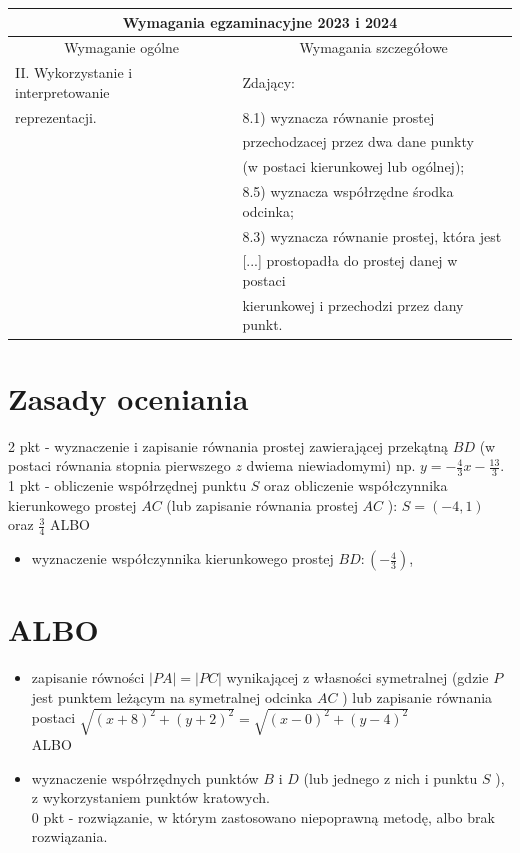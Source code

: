 \documentclass[10pt]{article}
\begin{document}
\begin{center}
\begin{tabular}{|l|l|}
\hline
\multicolumn{2}{|c|}{Wymagania egzaminacyjne 2023 i 2024} \\
\hline
\multicolumn{1}{|c|}{Wymaganie ogólne} & \multicolumn{1}{c|}{Wymagania szczegółowe} \\
\hline
II. Wykorzystanie i interpretowanie & Zdający: \\
reprezentacji. & 8.1) wyznacza równanie prostej \\
 & przechodzacej przez dwa dane punkty \\
 & (w postaci kierunkowej lub ogólnej); \\
 & 8.5) wyznacza współrzędne środka odcinka; \\
 & 8.3) wyznacza równanie prostej, która jest \\
 & [...] prostopadła do prostej danej w postaci \\
 & kierunkowej i przechodzi przez dany punkt. \\
\hline
\end{tabular}
\end{center}

\section*{Zasady oceniania}
2 pkt - wyznaczenie i zapisanie równania prostej zawierającej przekątną $B D$ (w postaci równania stopnia pierwszego $z$ dwiema niewiadomymi) np. $y=-\frac{4}{3} x-\frac{13}{3}$.\\
1 pkt - obliczenie współrzędnej punktu $S$ oraz obliczenie współczynnika kierunkowego prostej $A C$ (lub zapisanie równania prostej $A C$ ): $S=(-4,1)$ oraz $\frac{3}{4}$ ALBO

\begin{itemize}
  \item wyznaczenie współczynnika kierunkowego prostej $B D:\left(-\frac{4}{3}\right)$,
\end{itemize}

\section*{ALBO}
\begin{itemize}
  \item zapisanie równości $|P A|=|P C|$ wynikającej z własności symetralnej (gdzie $P$ jest punktem leżącym na symetralnej odcinka $A C$ ) lub zapisanie równania postaci $\sqrt{(x+8)^{2}+(y+2)^{2}}=\sqrt{(x-0)^{2}+(y-4)^{2}}$\\
ALBO
  \item wyznaczenie współrzędnych punktów $B$ i $D$ (lub jednego z nich i punktu $S$ ), z wykorzystaniem punktów kratowych.\\
0 pkt - rozwiązanie, w którym zastosowano niepoprawną metodę, albo brak rozwiązania.
\end{itemize}
\end{document}
